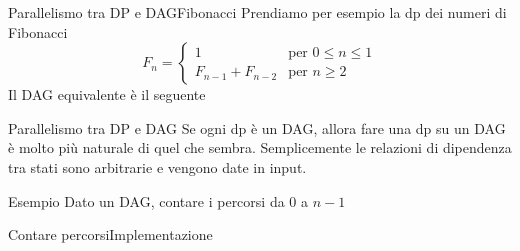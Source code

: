 \documentclass[compress]{beamer}
\begin{document}
\begin{frame}{Parallelismo tra DP e DAG}{Fibonacci}
    Prendiamo per esempio la dp dei numeri di Fibonacci
    \[
        F_n =
        \begin{cases}
            1 \quad & \text{per } 0 \leq n \leq 1 \\
            F_{n-1} + F_{n-2} & \text{per } n \geq 2
        \end{cases}
    \]
    \pause
    Il DAG equivalente \`e il seguente
    \begin{center}
        \scalebox{0.7}{}
    \end{center}
\end{frame}

\begin{frame}{Parallelismo tra DP e DAG}
    Se ogni dp \`e un DAG, allora fare una dp su un DAG \`e molto pi\`u naturale di quel che sembra.
    \vfill
    Semplicemente le relazioni di dipendenza tra stati sono arbitrarie e vengono date in input.
    \vfill
    \begin{exampleblock}{Esempio}
        Dato un DAG, contare i percorsi da $0$ a $n-1$
    \end{exampleblock}
\end{frame}


\begin{frame}{Contare percorsi}{Implementazione}
\end{frame}
\end{document}
